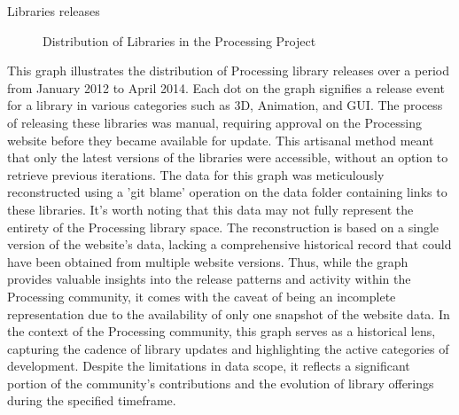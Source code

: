 {
	\LARGE
	\noindent Libraries releases
}

\begin{figure}[H]
	
	\caption{Distribution of Libraries in the Processing Project}
	\label{figure:libraries}
\end{figure}

\begin{multicols}{3}
	\noindent
	This graph illustrates the distribution of Processing library releases over a period from January 2012 to April 2014. Each dot on the graph signifies a release event for a library in various categories such as 3D, Animation, and GUI. The process of releasing these libraries was manual, requiring approval on the Processing website before they became available for update. This artisanal method meant that only the latest versions of the libraries were accessible, without an option to retrieve previous iterations.
	\noindent
	The data for this graph was meticulously reconstructed using a 'git blame' operation on the data folder containing links to these libraries. It's worth noting that this data may not fully represent the entirety of the Processing library space. The reconstruction is based on a single version of the website's data, lacking a comprehensive historical record that could have been obtained from multiple website versions. Thus, while the graph provides valuable insights into the release patterns and activity within the Processing community, it comes with the caveat of being an incomplete representation due to the availability of only one snapshot of the website data.
\noindent	
	In the context of the Processing community, this graph serves as a historical lens, capturing the cadence of library updates and highlighting the active categories of development. Despite the limitations in data scope, it reflects a significant portion of the community's contributions and the evolution of library offerings during the specified timeframe.	
\end{multicols}
